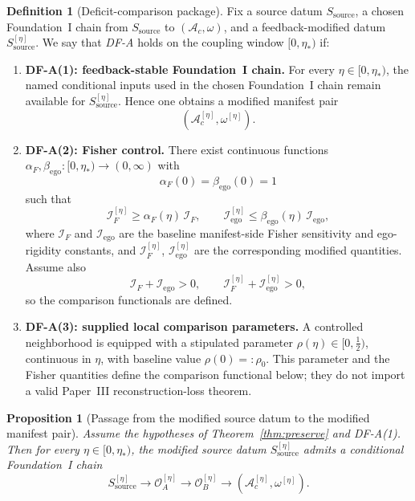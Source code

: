 \documentclass[12pt]{article}
\newtheorem{proposition}[theorem]{Proposition}
\theoremstyle{definition}
\newtheorem{definition}[theorem]{Definition}
\theoremstyle{remark}
\begin{document}
\begin{definition}[Deficit-comparison package]\label{def:DFA}
Fix a source datum \(S_{\mathrm{source}}\), a chosen Foundation~I chain
from \(S_{\mathrm{source}}\) to \((\mathcal A_c,\omega)\), and a
feedback-modified datum \(S_{\mathrm{source}}^{[\eta]}\). We say that
\emph{DF-A} holds on the coupling window \([0,\eta_*)\) if:
\begin{enumerate}
\item \textbf{DF-A(1): feedback-stable Foundation~I chain.}
  For every \(\eta\in[0,\eta_*)\), the named conditional inputs used in
  the chosen Foundation~I chain remain available for
  \(S_{\mathrm{source}}^{[\eta]}\). Hence one obtains a modified manifest
  pair
  \[
  (\mathcal A_c^{[\eta]},\omega^{[\eta]}).
  \]
\item \textbf{DF-A(2): Fisher control.}
  There exist continuous functions
  \(\alpha_F,\beta_{\mathrm{ego}}:[0,\eta_*)\to(0,\infty)\) with
  \[
  \alpha_F(0)=\beta_{\mathrm{ego}}(0)=1
  \]
  such that
  \[
  \mathcal I_F^{[\eta]}
  \ge
  \alpha_F(\eta)\,\mathcal I_F,
  \qquad
  \mathcal I_{\mathrm{ego}}^{[\eta]}
  \le
  \beta_{\mathrm{ego}}(\eta)\,\mathcal I_{\mathrm{ego}},
  \]
  where \(\mathcal I_F\) and
  \(\mathcal I_{\mathrm{ego}}\) are the baseline manifest-side Fisher
  sensitivity and ego-rigidity constants, and
  \(\mathcal I_F^{[\eta]}\),
  \(\mathcal I_{\mathrm{ego}}^{[\eta]}\) are the corresponding modified
  quantities. Assume also
  \[
  \mathcal I_F+\mathcal I_{\mathrm{ego}}>0,
  \qquad
  \mathcal I_F^{[\eta]}+\mathcal I_{\mathrm{ego}}^{[\eta]}>0,
  \]
  so the comparison functionals are defined.
\item \textbf{DF-A(3): supplied local comparison parameters.}
  A controlled neighborhood is equipped with a stipulated parameter
  \(\rho(\eta)\in[0,\tfrac12)\), continuous in \(\eta\), with baseline
  value \(\rho(0)=:\rho_0\). This parameter and the Fisher quantities
  define the comparison functional below; they do not import a valid
  Paper~III reconstruction-loss theorem.
\end{enumerate}
\end{definition}

\begin{proposition}[Passage from the modified source datum to the modified manifest pair]
\label{prop:chain}
Assume the hypotheses of Theorem~\ref{thm:preserve} and DF-A(1). Then
for every \(\eta\in[0,\eta_*)\), the modified source datum
\(S_{\mathrm{source}}^{[\eta]}\) admits a conditional Foundation~I chain
\[
S_{\mathrm{source}}^{[\eta]}
\to
\mathcal O_A^{[\eta]}
\to
\mathcal O_B^{[\eta]}
\to
(\mathcal A_c^{[\eta]},\omega^{[\eta]}).
\]
\end{proposition}
\end{document}
